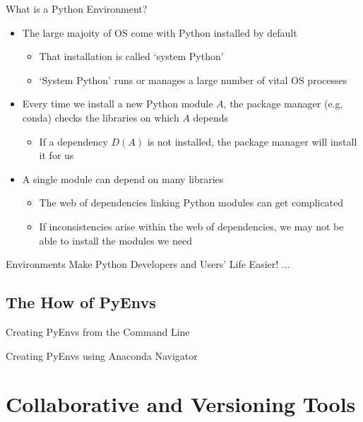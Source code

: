 \documentclass[aspectratio=1610]{beamer}
\begin{document}
\begin{frame}[c]{What is a Python Environment?}
	\begin{itemize}
		\item The large majoity of OS come with Python installed by default
		\begin{itemize}
			\item That installation is called `system Python'
			\item `System Python' runs or manages a large number of vital OS processes
		\end{itemize}
		\item  Every time we install a new Python module $A$, the package manager (e.g, conda) checks the libraries on which $A$ depends
		\begin{itemize}
		\item If a dependency $D(A)$ is not installed, the package manager will install it for us
	        \end{itemize}
		\item A single module can depend on many libraries
		\begin{itemize}
		\item The web of dependencies linking Python modules can get complicated
		\item If inconsistencies arise within the web of dependencies, we may not be able to install the modules we need
		\end{itemize}
	\end{itemize}
\end{frame}

\begin{frame}[c]{Environments Make Python Developers and Users' Life Easier!}
...
\end{frame}

\subsection{The How of PyEnvs}

\begin{frame}[c]{Creating PyEnvs from the Command Line}	
\end{frame}

\begin{frame}[c]{Creating PyEnvs using Anaconda Navigator}	
\end{frame}


\section{Collaborative and Versioning Tools}
\end{document}
